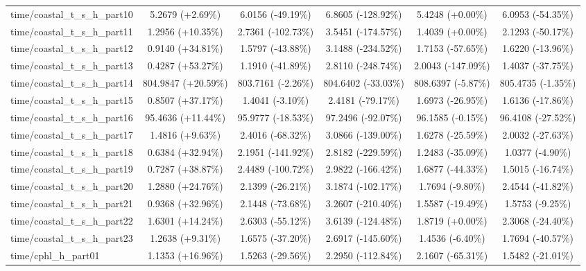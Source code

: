 \begin{table}[htbp]
{\begin{tabular}{lccccc}
time/coastal\_t\_s\_h\_part10 & 5.2679 (+2.69\%) & 6.0156 (-49.19\%) & 6.8605 (-128.92\%) & 5.4248 (+0.00\%) & 6.0953 (-54.35\%) \\
time/coastal\_t\_s\_h\_part11 & 1.2956 (+10.35\%) & 2.7361 (-102.73\%) & 3.5451 (-174.57\%) & 1.4039 (+0.00\%) & 2.1293 (-50.17\%) \\
time/coastal\_t\_s\_h\_part12 & 0.9140 (+34.81\%) & 1.5797 (-43.88\%) & 3.1488 (-234.52\%) & 1.7153 (-57.65\%) & 1.6220 (-13.96\%) \\
time/coastal\_t\_s\_h\_part13 & 0.4287 (+53.27\%) & 1.1910 (-41.89\%) & 2.8110 (-248.74\%) & 2.0043 (-147.09\%) & 1.4037 (-37.75\%) \\
time/coastal\_t\_s\_h\_part14 & 804.9847 (+20.59\%) & 803.7161 (-2.26\%) & 804.6402 (-33.03\%) & 808.6397 (-5.87\%) & 805.4735 (-1.35\%) \\
time/coastal\_t\_s\_h\_part15 & 0.8507 (+37.17\%) & 1.4041 (-3.10\%) & 2.4181 (-79.17\%) & 1.6973 (-26.95\%) & 1.6136 (-17.86\%) \\
time/coastal\_t\_s\_h\_part16 & 95.4636 (+11.44\%) & 95.9777 (-18.53\%) & 97.2496 (-92.07\%) & 96.1585 (-0.15\%) & 96.4108 (-27.52\%) \\
time/coastal\_t\_s\_h\_part17 & 1.4816 (+9.63\%) & 2.4016 (-68.32\%) & 3.0866 (-139.00\%) & 1.6278 (-25.59\%) & 2.0032 (-27.63\%) \\
time/coastal\_t\_s\_h\_part18 & 0.6384 (+32.94\%) & 2.1951 (-141.92\%) & 2.8182 (-229.59\%) & 1.2483 (-35.09\%) & 1.0377 (-4.90\%) \\
time/coastal\_t\_s\_h\_part19 & 0.7287 (+38.87\%) & 2.4489 (-100.72\%) & 2.9822 (-166.42\%) & 1.6877 (-44.33\%) & 1.5015 (-16.74\%) \\
time/coastal\_t\_s\_h\_part20 & 1.2880 (+24.76\%) & 2.1399 (-26.21\%) & 3.1874 (-102.17\%) & 1.7694 (-9.80\%) & 2.4544 (-41.82\%) \\
time/coastal\_t\_s\_h\_part21 & 0.9368 (+32.96\%) & 2.1448 (-73.68\%) & 3.2607 (-210.40\%) & 1.5587 (-19.49\%) & 1.5753 (-9.25\%) \\
time/coastal\_t\_s\_h\_part22 & 1.6301 (+14.24\%) & 2.6303 (-55.12\%) & 3.6139 (-124.48\%) & 1.8719 (+0.00\%) & 2.3068 (-24.40\%) \\
time/coastal\_t\_s\_h\_part23 & 1.2638 (+9.31\%) & 1.6575 (-37.20\%) & 2.6917 (-145.60\%) & 1.4536 (-6.40\%) & 1.7694 (-40.57\%) \\
time/cphl\_h\_part01 & 1.1353 (+16.96\%) & 1.5263 (-29.56\%) & 2.2950 (-112.84\%) & 2.1607 (-65.31\%) & 1.5482 (-21.01\%) \\

\end{tabular}}
\end{table}
